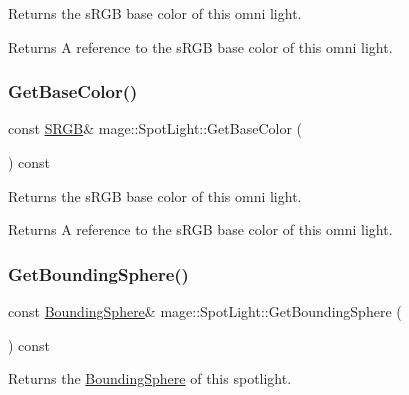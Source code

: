 Returns the s\+R\+GB base color of this omni light.

\begin{DoxyReturn}{Returns}
A reference to the s\+R\+GB base color of this omni light. 
\end{DoxyReturn}
\hypertarget{classmage_1_1_spot_light_afe96354e78abccea8fd5a4745728f5f3}{}\label{classmage_1_1_spot_light_afe96354e78abccea8fd5a4745728f5f3} 
\subsubsection{\texorpdfstring{Get\+Base\+Color()}{GetBaseColor()}\hspace{0.1cm}{\footnotesize\ttfamily [2/2]}}
{\footnotesize\ttfamily const \hyperlink{structmage_1_1_s_r_g_b}{S\+R\+GB}\& mage\+::\+Spot\+Light\+::\+Get\+Base\+Color (\begin{DoxyParamCaption}{ }\end{DoxyParamCaption}) const\hspace{0.3cm}{\ttfamily [noexcept]}}

Returns the s\+R\+GB base color of this omni light.

\begin{DoxyReturn}{Returns}
A reference to the s\+R\+GB base color of this omni light. 
\end{DoxyReturn}
\hypertarget{classmage_1_1_spot_light_a5a2a8fcb3062256657c424d5eefe44f4}{}\label{classmage_1_1_spot_light_a5a2a8fcb3062256657c424d5eefe44f4} 
\subsubsection{\texorpdfstring{Get\+Bounding\+Sphere()}{GetBoundingSphere()}}
{\footnotesize\ttfamily const \hyperlink{classmage_1_1_bounding_sphere}{Bounding\+Sphere}\& mage\+::\+Spot\+Light\+::\+Get\+Bounding\+Sphere (\begin{DoxyParamCaption}{ }\end{DoxyParamCaption}) const\hspace{0.3cm}{\ttfamily [noexcept]}}

Returns the \hyperlink{classmage_1_1_bounding_sphere}{Bounding\+Sphere} of this spotlight.

